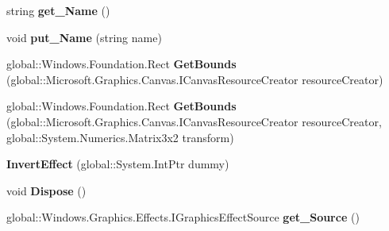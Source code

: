 \begin{DoxyCompactItemize}
string {\bfseries get\+\_\+\+Name} ()
\item 
\mbox{\label{class_microsoft_1_1_graphics_1_1_canvas_1_1_effects_1_1_invert_effect_a4a1d4fe9e7b616ac0bdb5ca7ac97619d}} 
void {\bfseries put\+\_\+\+Name} (string name)
\item 
\mbox{\label{class_microsoft_1_1_graphics_1_1_canvas_1_1_effects_1_1_invert_effect_a5fc010c96cbc6ac320c75188779ef15f}} 
global\+::\+Windows.\+Foundation.\+Rect {\bfseries Get\+Bounds} (global\+::\+Microsoft.\+Graphics.\+Canvas.\+I\+Canvas\+Resource\+Creator resource\+Creator)
\item 
\mbox{\label{class_microsoft_1_1_graphics_1_1_canvas_1_1_effects_1_1_invert_effect_a74ffdb0e709635a8916e51a009e69928}} 
global\+::\+Windows.\+Foundation.\+Rect {\bfseries Get\+Bounds} (global\+::\+Microsoft.\+Graphics.\+Canvas.\+I\+Canvas\+Resource\+Creator resource\+Creator, global\+::\+System.\+Numerics.\+Matrix3x2 transform)
\item 
\mbox{\label{class_microsoft_1_1_graphics_1_1_canvas_1_1_effects_1_1_invert_effect_a22f313595335226f5fa4bd22ccbe50de}} 
{\bfseries Invert\+Effect} (global\+::\+System.\+Int\+Ptr dummy)
\item 
\mbox{\label{class_microsoft_1_1_graphics_1_1_canvas_1_1_effects_1_1_invert_effect_a4cbb66c8027cb5045b12c5081e5c3595}} 
void {\bfseries Dispose} ()
\item 
\mbox{\label{class_microsoft_1_1_graphics_1_1_canvas_1_1_effects_1_1_invert_effect_a1a48c5114100636a70cd61f22db40b37}} 
global\+::\+Windows.\+Graphics.\+Effects.\+I\+Graphics\+Effect\+Source {\bfseries get\+\_\+\+Source} ()
\item 
\mbox{\label{class_microsoft_1_1_graphics_1_1_canvas_1_1_effects_1_1_invert_effect_aba1a182ec0dbb283e58826cd8e09df24}} 

\end{DoxyCompactItemize}
